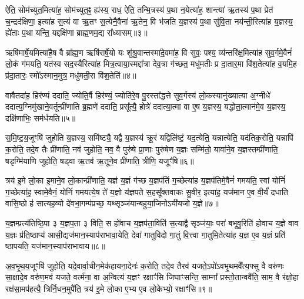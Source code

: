 ऐति॒ सोम॑च्युत॒मित्या॑ह॒ सोम॑च्युत॒ꣴ॒ ह्य॑स्य॒ राध॒ ऐति॒ तन्मि॒त्रस्य॑ प॒था न॒येत्या॑ह॒ शान्त्या॑ ऋ॒तस्य॑ प॒था प्रेत॑ च॒न्द्रद॑क्षिणा॒ इत्या॑ह स॒त्यं वा ऋ॒तꣳ स॒त्येनै॒वैना॑ ऋ॒तेन॒ वि भ॑जति य॒ज्ञस्य॑ प॒था सु॑वि॒ता नय॑न्ती॒रित्या॑ह य॒ज्ञस्य॒ ह्ये॑ताः प॒था यन्ति॒ यद्दक्षि॑णा ब्राह्म॒णम॒द्य रा᳚ध्यासम्॥३॥

ऋषि॑मार्\mbox{}षे॒यमित्या॑है॒ष वै ब्रा᳚ह्म॒ण ऋषि॑रार्\mbox{}षे॒यो यः शु॑श्रु॒वान्तस्मा॑दे॒वमा॑ह॒ वि सुवः॒ पश्य॒ व्य॑न्तरि॑क्ष॒मित्या॑ह सुव॒र्गमे॒वैनं॑ लो॒कं ग॑मयति॒ यत॑स्व सद॒स्यै॑रित्या॑ह मित्र॒त्वाया॒स्मद्दा᳚त्रा देव॒त्रा ग॑च्छत॒ मधु॑मतीः प्र दा॒तार॒मा वि॑श॒तेत्या॑ह व॒यमि॒ह प्र॑दा॒तारः॒ स्मो᳚\-ऽस्मान॒मुत्र॒ मधु॑मती॒रा वि॑श॒तेति॑॥४॥

वावैतदा॑ह॒ हिर॑ण्यं ददाति॒ ज्योति॒र्वै हिर॑ण्यं॒ ज्योति॑रे॒व पु॒रस्ता᳚द्धत्ते सुव॒र्गस्य॑ लो॒कस्यानु॑ख्यात्या अ॒ग्नीधे॑ ददात्य॒ग्निमु॑खाने॒वर्तून्प्री॑णाति ब्र॒ह्मणे॑ ददाति॒ प्रसू᳚त्यै॒ होत्रे॑ ददात्या॒त्मा वा ए॒ष य॒ज्ञस्य॒ यद्धोता॒त्मान॑मे॒व य॒ज्ञस्य॒ दक्षि॑णाभिः॒ सम॑र्धयति॥५॥

{\anuvakamend[{हिर॑ण्य॒ꣳ॒ राधो॑ राध्यासम॒मुत्र॒ मधु॑मती॒रा वि॑श॒तेत्य॒ष्टात्रिꣳ॑शच्च॥१॥}]}

स॒मि॒ष्ट॒य॒जूꣳषि॑ जुहोति य॒ज्ञस्य॒ समि॑ष्ट्यै॒ यद्वै य॒ज्ञस्य॑ क्रू॒रं यद्विलि॑ष्टं॒ यद॒त्येति॒ यन्नात्येति॒ यद॑तिक॒रोति॒ यन्नापि॑ क॒रोति॒ तदे॒व तैः प्री॑णाति॒ नव॑ जुहोति॒ नव॒ वै पुरु॑षे प्रा॒णाः पुरु॑षेण य॒ज्ञः सम्मि॑तो॒ यावा॑ने॒व य॒ज्ञस्तम्प्री॑णाति॒ षडृग्मि॑याणि जुहोति॒ षड्वा ऋ॒तव॑ ऋ॒तूने॒व प्री॑णाति॒ त्रीणि॒ यजूꣳ॑षि॥६॥

त्रय॑ इ॒मे लो॒का इ॒माने॒व लो॒कान्प्री॑णाति॒ यज्ञ॑ य॒ज्ञं ग॑च्छ य॒ज्ञप॑तिं ग॒च्छेत्या॑ह य॒ज्ञप॑तिमे॒वैनं॑ गमयति॒ स्वां योनिं॑ ग॒च्छेत्या॑ह॒ स्वामे॒वैनं॒ योनिं॑ गमयत्ये॒ष ते॑ य॒ज्ञो य॑ज्ञपते स॒हसू᳚क्तवाकः सु॒वीर॒ इत्या॑ह॒ यज॑मान ए॒व वी॒र्यं॑ दधाति वासि॒ष्ठो ह॑ सात्यह॒व्यो दे॑वभा॒गम्प॑प्रच्छ॒ यथ्सृञ्ज॑यान्बहुया॒जिनो\-ऽयी॑यजो य॒ज्ञे॥७॥

य॒ज्ञम्प्रत्य॑तिष्ठि॒पा ३ य॒ज्ञप॒ता ३ विति॒ स हो॑वाच य॒ज्ञप॑ता॒विति॑ स॒त्याद्वै सृञ्ज॑याः॒ परा॑ बभूवु॒रिति॑ होवाच य॒ज्ञे वाव य॒ज्ञः प्र॑ति॒ष्ठाप्य॑ आसी॒द्यज॑मान॒स्याप॑राभावा॒येति॒ देवा॑ गातुविदो गा॒तुं वि॒त्त्वा गा॒तुमि॒तेत्या॑ह य॒ज्ञ ए॒व य॒ज्ञं प्रति॑ ष्ठापयति॒ यज॑मान॒स्याप॑राभावाय॥८॥

{\anuvakamend[{यजूꣳ॑षि य॒ज्ञ एक॑चत्वारिꣳशच्च॥२॥}]}

अ॒व॒भृ॒थ॒य॒जूꣳषि॑ जुहोति॒ यदे॒वार्वा॒चीन॒मेक॑हायना॒देनः॑ क॒रोति॒ तदे॒व तैरव॑ यजते॒\-ऽपो॑\-ऽवभृ॒थमवै᳚त्य॒फ्सु वै वरु॑णः सा॒क्षादे॒व वरु॑ण॒मव॑ यजते॒ वर्त्म॑ना॒ वा अ॒न्वित्य॑ य॒ज्ञꣳ रक्षाꣳ॑सि जिघाꣳसन्ति॒ साम्ना᳚ प्रस्तो॒तान्ववै॑ति॒ साम॒ वै र॑क्षो॒हा रक्ष॑सा॒मप॑हत्यै॒ त्रिर्नि॒धन॒मुपै॑ति॒ त्रय॑ इ॒मे लो॒का ए॒भ्य ए॒व लो॒केभ्यो॒ रक्षाꣳ॑सि॥९॥

